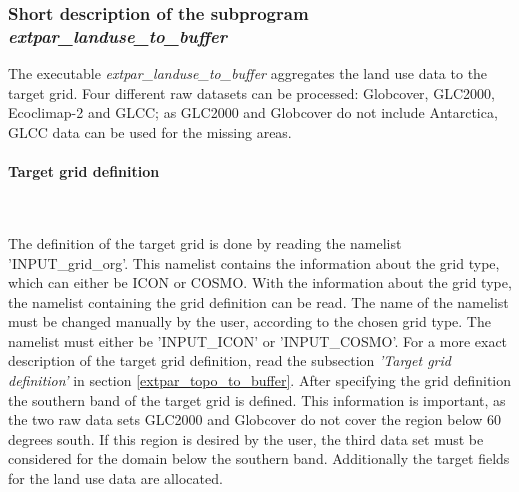 \documentclass[a4paper,10pt,DIV14,BCOR1cm,titlepage,twoside]{scrartcl}
\begin{document}
\subsubsection{Short description of the subprogram \textit{extpar\_landuse\_to\_buffer}}
The executable \textit{extpar\_landuse\_to\_buffer} aggregates the land use data to the target grid. Four different raw datasets can be processed: Globcover, GLC2000, Ecoclimap-2 and GLCC; as GLC2000 and Globcover do not include Antarctica, GLCC data can be used for the missing areas.
\paragraph{Target grid definition}\ \par\medskip\noindent
The definition of the target grid is done by reading the namelist 'INPUT\_grid\_org'. This namelist contains the information about the grid type, which can either be ICON or COSMO. With the information about the grid type, the namelist containing the grid definition can be read. The name of the namelist must be changed manually by the user, according to the chosen grid type. The namelist must either be 'INPUT\_ICON' or 'INPUT\_COSMO'. For a more exact description of the target grid definition, read the subsection \textit{'Target grid definition'} in section \ref{extpar_topo_to_buffer}. After specifying the grid definition the southern band of the target grid is defined. This information is important, as the two raw data sets GLC2000 and Globcover do not cover the region below 60 degrees south. If this region is desired by the user, the third data set must be considered for the domain below the southern band. Additionally the target fields for the land use data are allocated. \par\medskip\noindent
\end{document}
